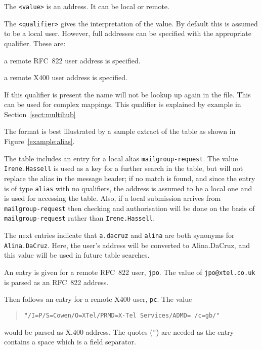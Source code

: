 The \verb|<value>| is an address. It can be local or remote.

The \verb|<qualifier>| gives the interpretation of the value. By
default this is assumed to be a local user. However, full addresses can
be specified with the appropriate qualifier. These are:

\begin{describe} 
\item[\verb+822+:]
a remote RFC~822 user address is specified.
\item[\verb+x400+:]
a remote X400 user address is specified.

\item[\verb|external|:] If this qualifier is present the name will not
be lookup up again in the  file. This can be used for
complex mappings.
This qualifier is explained by example in Section~\ref{sect:multihub}
\end{describe}

The format is best illustrated by a sample extract of the table as
shown in Figure~\ref{example:alias}.


The table includes an entry for a local alias \verb+mailgroup-request+.
The value \verb+Irene.Hassell+ is used as a key for a further search
in the  table,
but will not replace the alias in the message header; 
if no match is
found, and since the entry is of type \verb|alias| with no qualifiers,
the address is 
assumed to be a local one and is used for accessing the 
table. Also, if a local submission arrives from
\verb|mailgroup-request| then checking and authorisation will be done
on the basis of \verb|mailgroup-request| rather than
\verb|Irene.Hassell|.

The next entries indicate that \verb+a.dacruz+ and \verb+alina+ are
both synonyms for \verb+Alina.DaCruz+.  Here, the user's address will
be converted to Alina.DaCruz, and this value will be used in future
table searches.

An entry is given for a remote RFC~822 user, \verb|jpo|. The value of
\linebreak
\verb|jpo@xtel.co.uk| is parsed as an RFC~822
address.

Then follows an entry for a remote X400 user, \verb|pc|. The value
\begin{quote}\small\begin{verbatim}
"/I=P/S=Cowen/O=XTel/PRMD=X-Tel Services/ADMD= /c=gb/"
\end{verbatim}\end{quote}
would be parsed as X.400 address.  The quotes
({\tt "}) are needed as the entry contains a space which is a
field separator.

